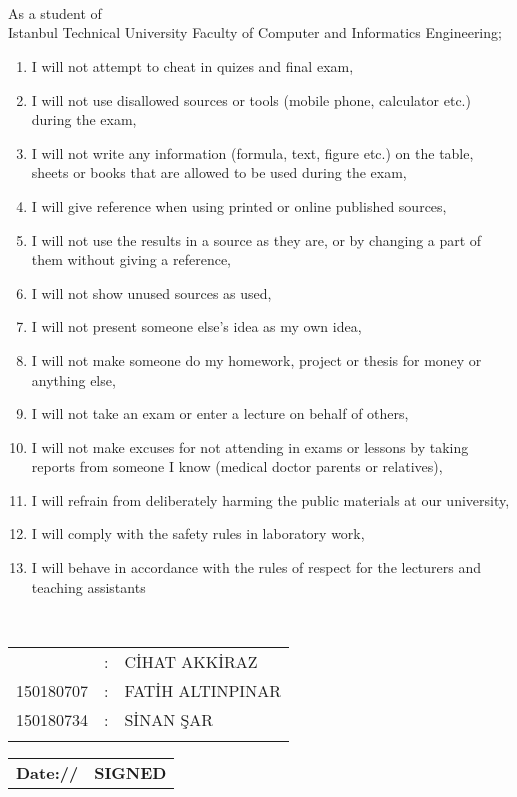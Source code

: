 
\thispagestyle{empty}
\\
\\
\\[0.2cm]
As a student of \\Istanbul Technical University Faculty of Computer and Informatics Engineering;
\begin{enumerate}
    \item I will not attempt to cheat in quizes and final exam,
    \item I will not use disallowed sources or tools (mobile phone, calculator etc.) during the exam,
    \item I will not write any information (formula, text, figure etc.) on the table, sheets or books that are allowed to be used during the exam,
    \item I will give reference when using printed or online published sources,
    \item I will not use the results in a source as they are, or by changing a part of them without giving a reference,
    \item I will not show unused sources as used, 
    \item I will not present someone else’s idea as my own idea, 
    \item I will not make someone do my homework, project or thesis for money or anything else,
    \item I will not take an exam or enter a lecture on behalf of others,
    \item I will not make excuses for not attending in exams or lessons by taking reports from someone I know (medical doctor parents or relatives),
    \item I will refrain from deliberately harming the public materials at our university,  
    \item I will comply with the safety rules in laboratory work,
    \item I will behave in accordance with the rules of respect for the lecturers and teaching assistants
\end{enumerate}
\vspace{-1em}
\\
\vspace{-1em}
\begin{table}[ht]
\centering
\begin{tabular}{rcl}
{
150180704  & : & C\.{I}HAT AKK\.{I}RAZ \\
150180707  & : & FAT\.{I}H ALTINPINAR \\
150180734  & : & S\.{I}NAN \c{S}AR \\
}
\end{tabular}
\end{table}
\vspace{-1em}
 \begin{table}[ht]
 \begin{tabular}{lr}
\textbf{Date:\hspace*{1.0cm}/\hspace*{1.0cm}/} &\qquad \qquad\qquad\qquad \qquad\qquad\qquad \qquad\qquad\qquad \qquad\qquad \textbf{SIGNED}\\
\end{tabular}
\end{table}